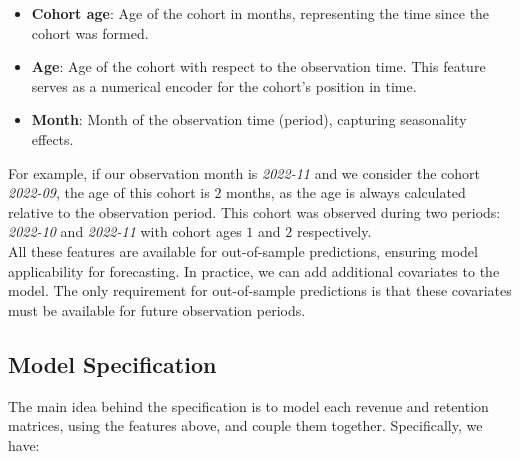 \documentclass[11pt]{amsart}
\theoremstyle{definition}
\begin{document}
\begin{itemize}
    \item {\bf Cohort age}: Age of the cohort in months, representing the time since the cohort was formed.
    \item {\bf Age}: Age of the cohort with respect to the observation time.
          This feature serves as a numerical encoder for the cohort's position in time.
    \item {\bf Month}: Month of the observation time (period), capturing seasonality effects.
\end{itemize}

For example, if our observation month is {\em 2022-11} and we consider the cohort {\em 2022-09}, the age of this cohort
is $2$ months, as the age is always calculated relative to the observation period. This cohort was observed during two
periods: {\em 2022-10} and {\em 2022-11} with cohort ages $1$ and $2$ respectively. \\

All these features are available for out-of-sample predictions, ensuring model applicability for forecasting.
In practice, we can add additional covariates to the model. The only requirement for out-of-sample predictions is that
these covariates must be available for future observation periods.

\subsection*{Model Specification}

The main idea behind the specification is to model each revenue and retention matrices, using the features above, and
couple them together. Specifically, we have:
\end{document}
